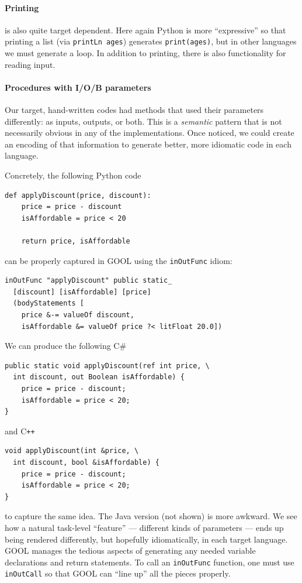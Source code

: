 \documentclass[sigplan,review,prologue,dvipsnames]{acmart}
\newcommand{\Csharp}{C\#}
\newcommand{\Cplusplus}{C\texttt{++}}
\begin{document}
\paragraph{Printing}
is also quite target dependent.  Here again Python
is more ``expressive'' so that printing a list (via
\verb|printLn ages|) generates \verb|print(ages)|, but in other languages
we must generate a loop. 
In addition to printing, there is also functionality for reading input.

\paragraph{Procedures with I/O/B parameters}
Our target, hand-written codes had methods that
used their parameters differently: as inputs, outputs, or both.
This is a \emph{semantic} pattern that is
not necessarily obvious in any of the implementations. Once noticed,
we could create an encoding of that information to generate better,
more idiomatic code in each language.

Concretely, the following Python code
\begin{lstlisting}
def applyDiscount(price, discount):
    price = price - discount
    isAffordable = price < 20

    return price, isAffordable
\end{lstlisting}
can be properly captured in GOOL using the \verb|inOutFunc| idiom:
\begin{lstlisting}
inOutFunc "applyDiscount" public static_
  [discount] [isAffordable] [price]
  (bodyStatements [
    price &-= valueOf discount,
    isAffordable &= valueOf price ?< litFloat 20.0])
\end{lstlisting}
We can produce the following \Csharp
\begin{lstlisting}
public static void applyDiscount(ref int price, \
  int discount, out Boolean isAffordable) {
    price = price - discount;
    isAffordable = price < 20;
}
\end{lstlisting}
and \Cplusplus
\begin{lstlisting}
void applyDiscount(int &price, \
  int discount, bool &isAffordable) {
    price = price - discount;
    isAffordable = price < 20;
}
\end{lstlisting}
to capture the same idea.  The Java version (not shown) is more
awkward.
We see how a natural task-level ``feature'' --- 
different kinds of parameters --- ends up being rendered differently,
but hopefully idiomatically, in each target language.  GOOL manages the
tedious aspects of generating any needed variable declarations and return
statements.  To call an \verb|inOutFunc| function, one must use
\verb|inOutCall| so that GOOL can ``line up'' all the pieces properly.
\end{document}

